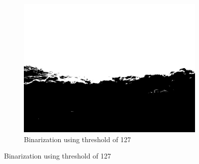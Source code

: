 \documentclass{article}
\begin{document}
\begin{itemize}
\begin{figure}[h]
      \begin{subfigure}{.45\textwidth}
        \includegraphics[width=\linewidth]{./result/labwork6a-gpu-out.jpg}
        \caption{Binarization using threshold of 127}
      \end{subfigure}
    \end{figure}
\end{itemize}
\newpage
\end{document}
